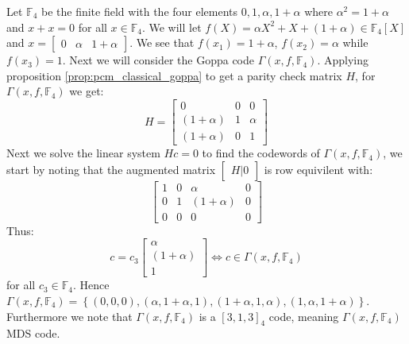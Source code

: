 \begin{example}\label{exmp:classical_goppa_over_gf4}
  Let $\mathbb{F}_{4}$ be the finite field with the four elements $0, 1, \alpha, 1 + \alpha$ where $\alpha^{2} = 1 + \alpha$ and $x + x = 0$ for all $x \in \mathbb{F}_4$. We will let $f(X) = \alpha X^{2} + X + (1 + \alpha) \in \mathbb{F}_4[X]$ and $x = \begin{bmatrix} 0 & \alpha & 1 + \alpha \end{bmatrix}$. We see that $f(x_1) = 1 + \alpha$, $f(x_2) = \alpha$ while $f(x_3) = 1$. Next we will consider the Goppa code $\Gamma(x, f, \mathbb{F}_4)$. Applying proposition \ref{prop:pcm_classical_goppa} to get a parity check matrix $H$, for $\Gamma(x, f, \mathbb{F}_4)$ we get:
  \begin{equation*}
    H = \begin{bmatrix}
0 & 0 & 0 \\
          (1 + \alpha) & 1 & \alpha \\
          (1 + \alpha) & 0 & 1
        \end{bmatrix}
  \end{equation*}
  Next we solve the linear system $Hc = 0$ to find the codewords of $\Gamma(x, f, \mathbb{F}_4)$, we start by noting that the augmented matrix $\begin{bmatrix} H | 0 \end{bmatrix}$ is row equivilent with:
  \begin{equation*}
    \begin{bmatrix}
      1 & 0 & \alpha & 0 \\
      0 & 1 & (1 + \alpha) & 0 \\
      0 & 0 & 0 & 0
    \end{bmatrix}
  \end{equation*}
  Thus:
  \begin{equation*}
    c = c_3 \begin{bmatrix} \alpha \\ (1 + \alpha) \\ 1 \end{bmatrix} \iff c \in \Gamma(x, f, \mathbb{F}_4)
  \end{equation*}
  for all $c_3 \in \mathbb{F}_4$. Hence $\Gamma(x, f, \mathbb{F}_4) = \left\{(0, 0, 0), (\alpha, 1 + \alpha, 1), (1 + \alpha, 1, \alpha) , (1, \alpha, 1 + \alpha)\right\}$. Furthermore we note that $\Gamma(x, f, \mathbb{F}_4)$ is a $[3, 1, 3]_4$ code, meaning $\Gamma(x, f, \mathbb{F}_4)$ MDS code.
\end{example}

